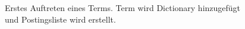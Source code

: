 \begin{figure}[ht]
    \caption{
        Erstes Auftreten eines Terms. Term wird Dictionary hinzugefügt und Postingsliste wird erstellt.
     }
   \label{fig:subfigure1}
\end{figure}


